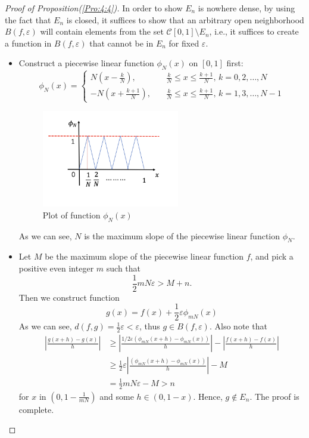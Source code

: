 \begin{proof}[Proof of Proposition(\ref{Pro:4:4})]
In order to show $E_n$ is nowhere dense, by using the fact that $E_n$ is closed, it suffices to show that an arbitrary open neighborhood $B(f,\varepsilon)$ will contain elements from the set $\mathcal{C}[0,1]\setminus E_n$, i.e., it suffices to create a function in $B(f,\varepsilon)$ that cannot be in $E_n$ for fixed $\varepsilon$.
\begin{itemize}
\item
Construct a piecewise linear function $\phi_N(x)$ on $[0,1]$ first:
\[
\phi_N(x)=\left\{
\begin{aligned}
N(x-\frac{k}{N}),&\quad \frac{k}{N}\le x\le\frac{k+1}{N}\mbox{, $k=0,2,\dots,N$}\\
-N(x+\frac{k+1}{N}),&\quad\frac{k}{N}\le x\le\frac{k+1}{N}\mbox{, $k=1,3,\dots,N-1$}
\end{aligned}
\right.
\]
\begin{figure}[H]
\centering
\includegraphics[width=6cm]{week4/4_3.png}
\caption{Plot of function $\phi_N(x)$}
\end{figure}
As we can see, $N$ is the maximum slope of the piecewise linear function $\phi_N$.
\item
Let $M$ be the maximum slope of the piecewise linear function $f$, and pick a positive even integer $m$ such that
\[
\frac{1}{2}mN\varepsilon>M+n.
\]
Then we construct function
\[
g(x) = f(x)+\frac{1}{2}\varepsilon\phi_{mN}(x)
\]
As we can see, $d(f,g)=\frac{1}{2}\varepsilon<\varepsilon$, thus $g\in B(f,\varepsilon).$ Also note that
\begin{align*}
\left|\frac{g(x+h)-g(x)}{h}\right|
&\ge
\left|\frac{1/2\varepsilon(\phi_{mN}(x+h) - \phi_{mN}(x))}{h}\right|
-
\left|\frac{f(x+h)-f(x)}{h}\right|\\
&\ge
\frac{1}{2}\varepsilon\left|\frac{(\phi_{mN}(x+h) - \phi_{mN}(x))}{h}\right|-M\\
&=\frac{1}{2}mN\varepsilon - M>n
\end{align*}
for $x$ in $(0,1-\frac{1}{mN})$ and some $h\in(0,1-x)$. Hence, $g\notin E_n$. The proof is complete.
\end{itemize}
\end{proof}

